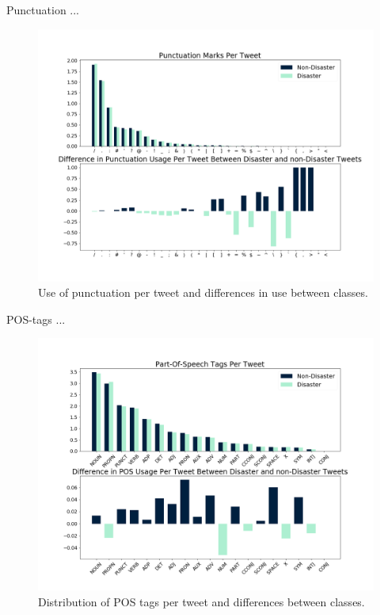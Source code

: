 \documentclass[journal, ]{IEEEtran}
\let\MYoriglatexcaption\caption
\renewcommand{\caption}[2][\relax]{\MYoriglatexcaption[#2]{#2}}
\begin{document}
Punctuation ...
\begin{figure}[hbt!]
  \centering
  \includegraphics[width=\linewidth]{../figures/punctuation.png}
  \caption{Use of punctuation per tweet and differences in use between classes.}
  \label{fig:punctuation}
\end{figure}

POS-tags    ...
\begin{figure}[hbt!]
  \centering
  \includegraphics[width=\linewidth]{../figures/part_of_speech.png}
  \caption{Distribution of POS tags per tweet and differences between classes.}
  \label{fig:part_of_speech}
\end{figure}
\end{document}
